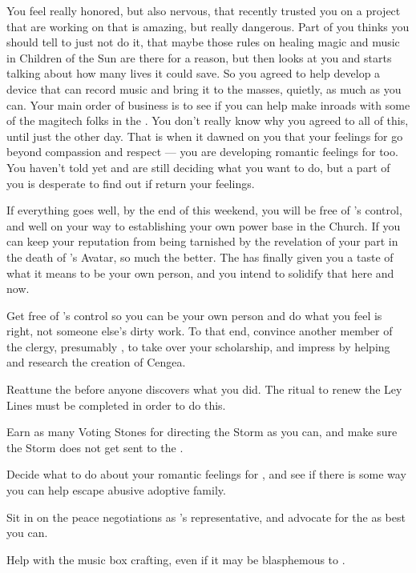 \documentclass[char]{GL2020}
\begin{document}
You feel really honored, but also nervous, that recently \cAdopted{\they} trusted you on a project that \cAdopted{\they} are working on that is amazing, but really dangerous. Part of you thinks you should tell \cAdopted{} to just not do it, that maybe those rules on healing magic and music in Children of the Sun are there for a reason, but then \cAdopted{\they} looks at you and starts talking about how many lives it could save. So you agreed to help \cAdopted{\them} develop a device that can record music and bring it to the masses, quietly, as much as you can. Your main order of business is to see if you can help \cAdopted{} make inroads with some of the magitech folks in the \pTech{}. You don’t really know why you agreed to all of this, until just the other day. That is when it dawned on you that your feelings for \cAdopted{} go beyond compassion and respect — you are developing romantic feelings for \cAdopted{\them} too. You haven't told \cAdopted{} yet and are still deciding what you want to do, but a part of you is desperate to find out if \cAdopted{\they} return your feelings.

If everything goes well, by the end of this weekend, you will be free of \cAntiChup{}'s control, and well on your way to establishing your own power base in the Church. If you can keep your reputation from being tarnished by the revelation of your part in the death of \cEbb{}'s Avatar, so much the better. The \pSchool{} has finally given you a taste of what it means to be your own person, and you intend to solidify that here and now.

\begin{itemz}
    \item Get free of \cAntiChup{}’s control so you can be your own person and do what you feel is right, not someone else’s dirty work. To that end, convince another member of the \pTech{} clergy, presumably \cBeetle{}, to take over your scholarship, and impress \cBeetle{} by helping \cEbbPriest{} and \cHeadScientist{} research the creation of Cengea.
    \item Reattune the \iScythe{} before anyone discovers what you did. The ritual to renew the Ley Lines must be completed in order to do this.
    \item Earn as many Voting Stones for directing the Storm as you can, and make sure the Storm does not get sent to the \pTech{}.
    \item Decide what to do about your romantic feelings for \cAdopted{}, and see if there is some way you can help \cAdopted{\them} escape \cAdopted{\their} abusive adoptive family.
    \item Sit in on the peace negotiations as \cAntiChup{}'s representative, and advocate for the \pTech{} as best you can.  
    \item Help \cAdopted{} with the music box \cAdopted{\they \are} crafting, even if it may be blasphemous to \cFarmGod{}.
\end{itemz}
\end{document}
